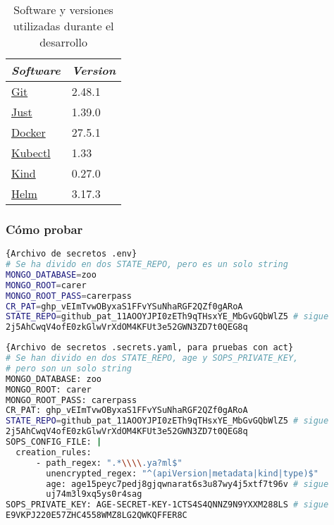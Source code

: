\begin{table}
  \centering
  \begin{tabular}{|l|l|}
    \hline
    \textit{Software} & \textit{Version} \\ \hline
    \href{https://git-scm.com/book/en/v2/Getting-Started-Installing-Git}{Git} & 2.48.1 \\ \hline
    \href{https://github.com/casey/just?tab=readme-ov-file#installation}{Just} & 1.39.0 \\ \hline
    \href{https://docs.docker.com/desktop/}{Docker} & 27.5.1 \\ \hline
    \href{https://kubernetes.io/docs/tasks/tools/#kubectl}{Kubectl} & 1.33 \\ \hline
    \href{https://kubernetes.io/docs/tasks/tools/#kind}{Kind} & 0.27.0 \\ \hline
    \href{https://helm.sh/docs/intro/install/}{Helm} & 3.17.3 \\ \hline
  \end{tabular}
  \caption{Software y versiones utilizadas durante el desarrollo}
  \label{table:software}
\end{table}

\subsubsection*{Cómo probar}

\begin{lstlisting}[language=bash,label=lst:env-file]{Archivo de secretos .env}
# Se ha divido en dos STATE_REPO, pero es un solo string
MONGO_DATABASE=zoo
MONGO_ROOT=carer
MONGO_ROOT_PASS=carerpass
CR_PAT=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
STATE_REPO=github_pat_11AOOYJPI0zETh9qTHsxYE_MbGvGQbWlZ5 # sigue
2j5AhCwqV4ofE0zkGlwVrXdOM4KFUt3e52GWN3ZD7t0QEG8q
\end{lstlisting}

\begin{lstlisting}[language=bash,label=lst:secrets-file]{Archivo de secretos .secrets.yaml, para pruebas con act}
# Se han divido en dos STATE_REPO, age y SOPS_PRIVATE_KEY,
# pero son un solo string
MONGO_DATABASE: zoo
MONGO_ROOT: carer
MONGO_ROOT_PASS: carerpass
CR_PAT: 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
STATE_REPO=github_pat_11AOOYJPI0zETh9qTHsxYE_MbGvGQbWlZ5 # sigue
2j5AhCwqV4ofE0zkGlwVrXdOM4KFUt3e52GWN3ZD7t0QEG8q
SOPS_CONFIG_FILE: |
  creation_rules:
      - path_regex: ".*\\\\.ya?ml$"
        unencrypted_regex: "^(apiVersion|metadata|kind|type)$"
        age: age15peyc7pedj8gjqwnarat6s3u87wy4j5xtf7t96v # sigue
        uj74m3l9xq5ys0r4sag
SOPS_PRIVATE_KEY: AGE-SECRET-KEY-1CTS4S4QNNZ9N9YXXM288LS # sigue
E9VKPJ220E57ZHC4558WMZ8LG2QWKQFFER8C
\end{lstlisting}


